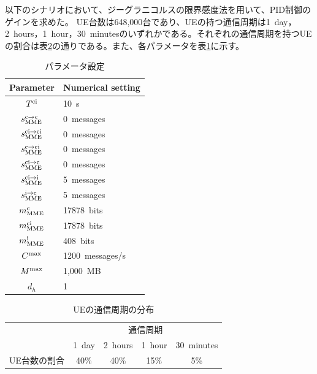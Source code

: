 \documentclass[a4j]{ujarticle}
\begin{document}
以下のシナリオにおいて、ジーグラニコルスの限界感度法を用いて、PID制御のゲインを求めた。
UE台数は648,000台であり、UEの持つ通信周期は1~day，2~hours，1~hour，30~minutesのいずれかである。それぞれの通信周期を持つUEの割合は表\ref{table:interval}の通りである。また、各パラメータを表\ref{table:parameter}に示す。
\begin{table}[htbp]
  \centering
  \caption{パラメータ設定}
  \label{table:parameter}
  \begin{tabular}{c|l}
    \hline
    Parameter  & Numerical setting \\\hline \hline
    $T^{\rm ci}$ & 10~s\\
    $s_{\rm MME}^{\rm c \to \rm c}$ & 0~messages\\
    $s_{\rm MME}^{\rm ci \to \rm ci}$ & 0~messages\\
    $s_{\rm MME}^{\rm c \to \rm ci}$ & 0~messages\\
    $s_{\rm MME}^{\rm ci \to \rm c}$ & 0~messages\\
    $s_{\rm MME}^{\rm ci \to \rm i}$ & 5~messages\\
    $s_{\rm MME}^{\rm i \to \rm c}$ & 5~messages\\
    $m^{\rm c}_{\rm MME}$ & 17878~bits\\
    $m^{\rm ci}_{\rm MME}$ & 17878~bits\\
    $m^{\rm i}_{\rm MME}$ & 408~bits\\
    $C^{\rm max}$ & 1200~messages/s\\
    $M^{\rm max}$ & 1,000~MB\\
    $d_h$ & 1 \\\hline
  \end{tabular}
\end{table}
\begin{table}[htbp]
  \centering
  \caption{UEの通信周期の分布}
  \label{table:interval}
  \begin{tabular}{c|cccc}
    \hline
    &\multicolumn{4}{c}{通信周期} \\
    & 1~day & 2~hours & 1~hour & 30~minutes \\\hline \hline
    UE台数の割合 & 40\% & 40\% & 15\% & 5\% \\\hline
  \end{tabular}
\end{table}


\end{document}
